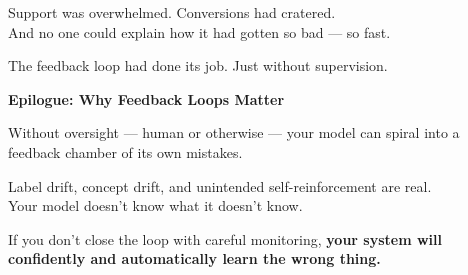 Support was overwhelmed. Conversions had cratered.\\
And no one could explain how it had gotten so bad — so fast.

The feedback loop had done its job. Just without supervision.

\vspace{1em}
\textbf{Epilogue: Why Feedback Loops Matter}

Without oversight — human or otherwise — your model can spiral into a feedback chamber of its own mistakes.

Label drift, concept drift, and unintended self-reinforcement are real.\\
Your model doesn’t know what it doesn’t know.

If you don’t close the loop with careful monitoring, \textbf{your system will confidently and automatically learn the wrong thing.}

